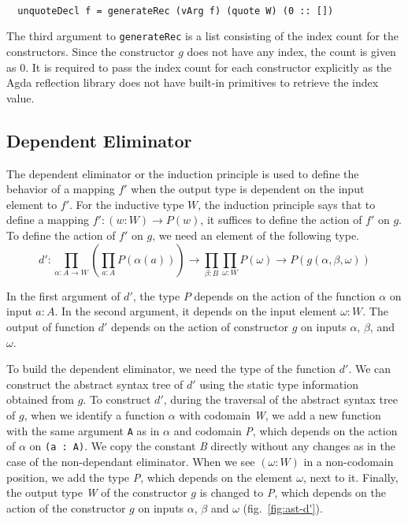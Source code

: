 \documentclass[sigplan,10pt]{acmart}
\begin{document}
\begin{center}
\begingroup
\fontsize{8pt}{9pt}\selectfont
\begin{Verbatim}

  unquoteDecl f = generateRec (vArg f) (quote W) (0 :: [])

\end{Verbatim}
\endgroup
\end{center}

\normalsize

The third argument to {\tt generateRec} is a list consisting of the index count for the constructors. Since the constructor $g$ does not have any index, the count is given as 0. It is required to pass the index count for each constructor explicitly as the Agda reflection library does not have built-in primitives to retrieve the index value.

\subsection{Dependent Eliminator}
\label{sec:sec3.2}

The dependent eliminator or the induction principle is used to define the behavior of a mapping $f'$ when the output type is dependent on the input element to $f'$. For the inductive type $W$, the induction principle says that to define a mapping $f' : (w : W) \rightarrow P(w)$, it suffices to define the action of $f'$ on $g$. To define the action of $f'$ on $g$, we need an element of the following type.
\begin{equation}
d' : \prod_{\alpha : A \rightarrow W} (\prod_{a : A} P(\alpha (a))) \rightarrow  \prod_{\beta : B} \prod_{\omega : W} P(\omega) \rightarrow P (g(\alpha, \beta, \omega)) \nonumber
\end{equation}

In the first argument of $d'$, the type $P$ depends on the action of the function $\alpha$ on input $a : A$. In the second argument, it depends on the input element $\omega : W$. The output of function $d'$ depends on the action of constructor $g$ on inputs $\alpha$, $\beta$, and $\omega$. 

To build the dependent eliminator, we need the type of the function $d'$. We can construct the abstract syntax tree of $d'$ using the static type information obtained from $g$. To construct $d'$, during the traversal of the abstract syntax tree of $g$, when we identify a function $\alpha$ with codomain \emph{W}, we add a new function with the same argument {\tt A} as in $\alpha$ and codomain \emph{P}, which depends on the action of $\alpha$ on {\tt (a : A)}. We copy the constant \emph{B} directly without any changes as in the case of the non-dependant eliminator. When we see $(\omega : W)$ in a non-codomain position, we add the type \emph{P}, which depends on the element $\omega$, next to it. Finally, the output type \emph{W} of the constructor $g$ is changed to \emph{P}, which depends on the action of the constructor $g$ on inputs $\alpha$, $\beta$ and $\omega$ (fig.~\ref{fig:ast-d'}). 
\end{document}
